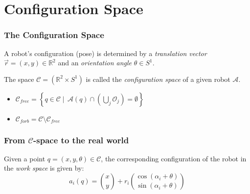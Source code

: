 \documentclass[ucs,9pt,pagenumbersfull]{beamer}
\begin{document}
\section{Configuration Space}
\begin{frame}
  \frametitle{The Configuration Space}
  A robot's configuration (pose) is determined by a \emph{translation vector} \(\vec{r}=(x,y) \in \mathbb{R}^2\) and an \emph{orientation angle} \(\theta\in S^1\).

  \begin{definition}
    The space \(\mathcal{C} = \left( \mathbb{R}^2 \times S^1 \right)\) is called the \emph{configuration space} of a given robot \(\mathcal{A}\).

    \begin{itemize}
    \item \(\mathcal{C}_{free} = \left\{ q \in \mathcal{C} \mid \,
        \mathcal{A}(q) \cap \left(\bigcup_{j} \mathcal{O}_j\right)=
        \emptyset \right\} \)
    \item \(\mathcal{C}_{forb}  = \mathcal{C} \setminus \mathcal{C}_{free}\)
    \end{itemize}
  \end{definition}
\end{frame}

\begin{frame}
  \frametitle{From \(\mathcal{C}\)-space to the real world}
  Given a point \(q=\left(x,y,\theta\right)\in \mathcal{C}\), the
  corresponding configuration of the robot in the \emph{work space} is given by:
  \[
  a_i(q) = \binom{x}{y}+r_i \binom{\cos(\alpha_i + \theta)}{\sin(\alpha_i+\theta)}
  \]

  \begin{figure}
    \centering
    
  \end{figure}
\end{frame}
\end{document}
